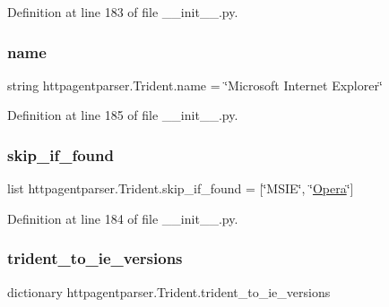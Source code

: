 Definition at line 183 of file \+\_\+\+\_\+init\+\_\+\+\_\+.\+py.

\hypertarget{classhttpagentparser_1_1_trident_a66855e9e222c4780c973d4d0e253b25e}{}\label{classhttpagentparser_1_1_trident_a66855e9e222c4780c973d4d0e253b25e} 
\subsubsection{\texorpdfstring{name}{name}}
{\footnotesize\ttfamily string httpagentparser.\+Trident.\+name = \char`\"{}Microsoft Internet Explorer\char`\"{}\hspace{0.3cm}{\ttfamily [static]}}



Definition at line 185 of file \+\_\+\+\_\+init\+\_\+\+\_\+.\+py.

\hypertarget{classhttpagentparser_1_1_trident_acc5542d3a8f58269c88f2c1c2126e35a}{}\label{classhttpagentparser_1_1_trident_acc5542d3a8f58269c88f2c1c2126e35a} 
\subsubsection{\texorpdfstring{skip\+\_\+if\+\_\+found}{skip\_if\_found}}
{\footnotesize\ttfamily list httpagentparser.\+Trident.\+skip\+\_\+if\+\_\+found = \mbox{[}\char`\"{}M\+S\+IE\char`\"{}, \char`\"{}\hyperlink{classhttpagentparser_1_1_opera}{Opera}\char`\"{}\mbox{]}\hspace{0.3cm}{\ttfamily [static]}}



Definition at line 184 of file \+\_\+\+\_\+init\+\_\+\+\_\+.\+py.

\hypertarget{classhttpagentparser_1_1_trident_a78dabcc84152bb6bd24bec45cd0f8f8e}{}\label{classhttpagentparser_1_1_trident_a78dabcc84152bb6bd24bec45cd0f8f8e} 
\subsubsection{\texorpdfstring{trident\+\_\+to\+\_\+ie\+\_\+versions}{trident\_to\_ie\_versions}}
{\footnotesize\ttfamily dictionary httpagentparser.\+Trident.\+trident\+\_\+to\+\_\+ie\+\_\+versions\hspace{0.3cm}{\ttfamily [static]}}

